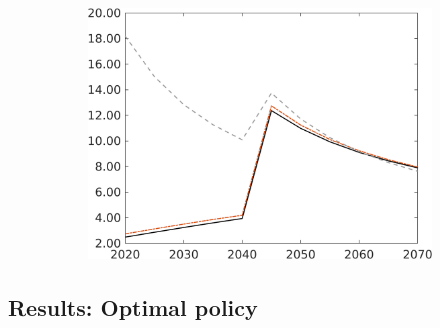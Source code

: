 \begin{figure}[h!!]
\begin{subfigure}{0.9\textwidth}
\begin{minipage}[]{0.32\textwidth}
	\end{minipage}
	\begin{minipage}[]{0.32\textwidth}
		\includegraphics[width=1\textwidth]{../../codding_model/own_basedOnFried/optimalPol_010922_revision/figures/all_13Sept22/CompRed_Taul0_gAg_spillover0_knspil0_nsk0_xgr0_sep0_LFlimit1_emsbase0_countec0_GovRev0_etaa0.79_lgd0.png}
	\end{minipage}
\end{subfigure}
\end{figure} 


\clearpage
\subsection{Results: Optimal policy}
